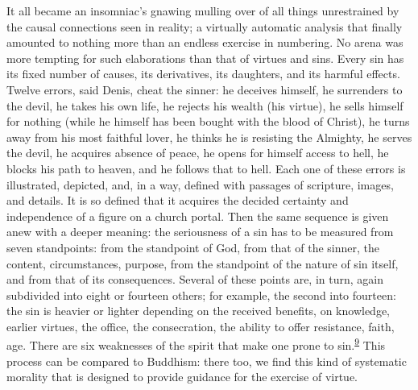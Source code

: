 It all became an insomniac's gnawing mulling over of all things
unrestrained by the causal connections seen in reality; a virtually
automatic analysis that finally amounted to nothing more than an endless
exercise in numbering. No arena was more tempting for such elaborations
than that of virtues and sins. Every sin has its fixed number of causes,
its derivatives, its daughters, and its harmful effects. Twelve errors,
said Denis, cheat the sinner: he deceives himself, he surrenders to the
devil, he takes his own life, he rejects his wealth (his virtue), he
sells himself for nothing (while he himself has been bought with the
blood of Christ), he turns away from his most faithful lover, he thinks
he is resisting the Almighty, he serves the devil, he acquires absence
of peace, he opens for himself access to hell, he blocks his path to
heaven, and he follows that to hell.
\protect\hypertarget{17_Chapter_Ten__THE_FAILURE_OF_IMAG.xhtmlux5cux23page_252}{}{}Each
one of these errors is illustrated, depicted, and, in a way, defined
with passages of scripture, images, and details. It is so defined that
it acquires the decided certainty and independence of a figure on a
church portal. Then the same sequence is given anew with a deeper
meaning: the seriousness of a sin has to be measured from seven
standpoints: from the standpoint of God, from that of the sinner, the
content, circumstances, purpose, from the standpoint of the nature of
sin itself, and from that of its consequences. Several of these points
are, in turn, again subdivided into eight or fourteen others; for
example, the second into fourteen: the sin is heavier or lighter
depending on the received benefits, on knowledge, earlier virtues, the
office, the consecration, the ability to offer resistance, faith, age.
There are six weaknesses of the spirit that make one prone to
sin.\textsuperscript{\protect\hypertarget{17_Chapter_Ten__THE_FAILURE_OF_IMAG.xhtmlux5cux23id_718}{\protect\hyperlink{23_NOTES.xhtmlux5cux23id_719}{9}}}
This process can be compared to Buddhism: there too, we find this kind
of systematic morality that is designed to provide guidance for the
exercise of virtue.

